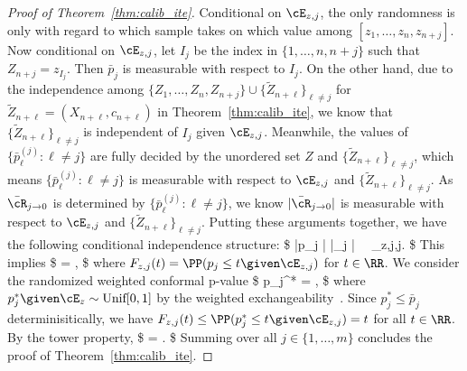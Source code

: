 \begin{proof}[Proof of Theorem~\ref{thm:calib_ite}]
Conditional on $\cE_{z,j}$,
the only randomness is only with regard to which
sample takes on which value among $[z_1,\dots,z_n,z_{n+j}]$.
Now conditional on $\cE_{z,j}$,
let $I_j$ be the index in $\{1,\dots,n,n+j\}$ such that
$Z_{n+j}=z_{I_j}$. Then $\bar{p}_j$ is measurable with respect to $I_j$.
On the other hand, due to the independence among
$\{Z_1,\dots,Z_n,Z_{n+j}\}\cup \{\tilde{Z}_{n+\ell}\}_{\ell\neq j}$
for $\tilde{Z}_{n+\ell} = (X_{n+\ell},c_{n+\ell})$ in Theorem~\ref{thm:calib_ite},
we know that $\{\tilde{Z}_{n+\ell}\}_{\ell\neq j}$ is independent of
$I_j$ given $\cE_{z,j}$.
Meanwhile,
the values of $\{\bar p_\ell^{(j)}\colon \ell\neq j\}$ are fully decided
by the unordered set $Z$ and $\{\tilde{Z}_{n+\ell}\}_{\ell\neq j}$,
which means
$\{\bar p_\ell^{(j)}\colon \ell\neq j\}$ is measurable with respect to
$\cE_{z,j}$ and $\{\tilde{Z}_{n+\ell}\}_{\ell\neq j}$.
As $\bar\cR_{j\to 0}$ is determined by $\{\bar p_\ell^{(j)}\colon \ell\neq j\}$,
we know $|\bar\cR_{j\to 0}|$ is  measurable with respect to
$\cE_{z,j}$ and $\{\tilde{Z}_{n+\ell}\}_{\ell\neq j}$.
Putting these arguments together,
we have the following conditional independence structure:
\$
\bar p_j  \indep  \big| \bar\cR_{j}  \big| ~\Biggiven ~\cE_{z,j},\quad \forall j.
\$
This implies
\$
\EE {} =     ,
\$
where $F_{z,j}(t) = \PP(p_j \leq t \given \cE_{z,j})$ for $t\in \RR$.
We consider
the randomized weighted conformal p-value
\$
{p}_j^* = ,
\$
where  $p_j^*\given \cE_z\sim \textrm{Unif}[0,1]$ by the weighted
exchangeability~\cite{tibshirani2019conformal,hu2020distribution}.
Since
$p_j^*\leq \bar p_j$ determinisitically, we
have $F_{z,j}(t) \leq \PP(p_j^* \leq t\given \cE_{z,j}) =t$ for
all $t\in \RR$. By the tower property,
\$
\EE{}
\leq
\EE{}
\leq \EE{} = .
\$
Summing over all $j\in\{1,\dots,m\}$ concludes the proof of Theorem~\ref{thm:calib_ite}.
\end{proof}

